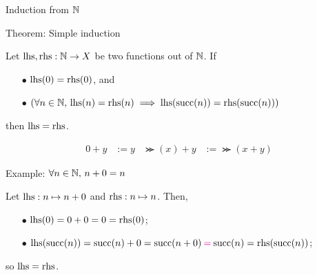 \begin{frame}{Induction from $\mathbb{N}$}

  \begin{block}{Theorem: Simple induction}
    \par Let $\mathrm{lhs}, \mathrm{rhs} : \mathbb{N} \to X$ be two functions out of $\mathbb{N}$. If
    \begin{itemize}[nosep]
      \item[$\bullet$] $\mathrm{lhs}(0) = \mathrm{rhs}(0)$, and
      \item[$\bullet$] $(\forall n \in \mathbb{N},\, \mathrm{lhs}(n) = \mathrm{rhs}(n) \implies \mathrm{lhs}( \operatorname{succ} (n) ) = \mathrm{rhs} ( \operatorname{succ} (n) ))$
    \end{itemize}
    then $\mathrm{lhs} = \mathrm{rhs}$.
  \end{block}

  \begin{align*}
    0 + y &:= y 
    & \Succ(x) + y &:= \Succ(x + y)
  \end{align*}

  \pause
  
  \begin{block}{Example: $\forall n \in \mathbb{N},\, n + 0 = n$}
    
    \pause

    \par Let $\mathrm{lhs} : n \mapsto n + 0$ and $\mathrm{rhs} : n \mapsto n$. Then,
    \pause
    \begin{itemize}[nosep]
      \item[$\bullet$] $\mathrm{lhs}(0) = 0 + 0 = 0 = \mathrm{rhs}(0)$; \pause
      \item[$\bullet$] $\mathrm{lhs}(\operatorname{succ}(n)) = \operatorname{succ}(n) + 0 = \operatorname{succ}(n + 0) \mathbin{\textcolor{magenta}{=}} \operatorname{succ}(n) = \mathrm{rhs}(\operatorname{succ}(n))$;
    \end{itemize}
    \pause
    so $\mathrm{lhs} = \mathrm{rhs}$.

  \end{block}

\end{frame}
